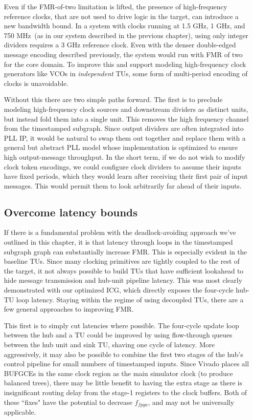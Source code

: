 Even if the FMR-of-two limitation is lifted, the presence of high-frequency
reference clocks, that are not used to drive logic in the target, can introduce
a new bandwidth bound. In a system with clocks running at 1.5 GHz, 1 GHz, and
750 MHz~(as in our system described in the previous chapter), using only
integer dividers requires a 3 GHz reference clock. Even with the denser
double-edged message encoding described previously, the system would run with
FMR of two for the core domain. To improve this and support modeling
high-frequency clock generators like VCOs in \emph{independent} TUs, some form of
multi-period encoding of clocks is unavoidable.

Without this there are two simple paths forward. The first is to preclude
modeling high-frequency clock sources and downstream dividers as distinct
units, but instead fold them into a single unit.  This removes the high
frequency channel from the timestamped subgraph. Since output dividers are often integrated
into PLL IP, it would be natural to swap them out together and replace them
with a general but abstract PLL model whose implementation is optimized to
ensure high output-message throughput. In the short term, if we do not wish to
modify clock token encodings, we could configure clock dividers to assume their
inputs have fixed periods, which they would learn after receiving their first
pair of input messages.  This would permit them to look arbitrarily far ahead
of their inputs.

\subsection{Overcome latency bounds}
If there is a fundamental problem with the deadlock-avoiding approach we've
outlined in this chapter, it is that latency through loops in the timestamped subgraph
graph can substantially increase FMR. This is especially evident in the
baseline TUs. Since many
clocking primitives are tightly coupled to the rest of the target, it not
always possible to build TUs that have sufficient lookahead to hide message
transmission and hub-unit pipeline latency. This was most clearly demonstrated
with our optimized ICG, which directly exposes the four-cycle hub-TU loop
latency. Staying within the regime of using decoupled TUs, there are a few general approaches
to improving FMR.

This first is to simply cut latencies where possible. The four-cycle update
loop between the hub and a TU could be improved by using flow-through queues
between the hub unit and sink TU, shaving one cycle of latency. More aggressively, it may also be
possible to combine the first two stages of the hub's control pipeline for small numbers of timestamped inputs. Since
Vivado places all BUFGCEs in the same clock region as the main simulator clock
(to produce balanced trees), there may be little benefit to having the extra
stage as there is insignificant routing delay from the stage-1 registers to the
clock buffers. Both of these ``fixes" have the potential to decrease
$f_{fpga}$, and may not be universally applicable.

